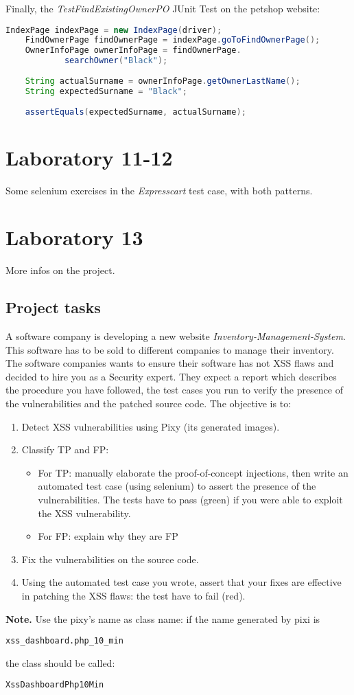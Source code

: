 \documentclass[a4paper, 10pt, titlepage]{article}
\begin{document}
Finally, the \textit{TestFindExistingOwnerPO} JUnit Test on the petshop website:
\begin{lstlisting}[language=java]
	IndexPage indexPage = new IndexPage(driver);
	FindOwnerPage findOwnerPage = indexPage.goToFindOwnerPage();
	OwnerInfoPage ownerInfoPage = findOwnerPage.
			searchOwner("Black");
		
	String actualSurname = ownerInfoPage.getOwnerLastName();
	String expectedSurname = "Black";
		
	assertEquals(expectedSurname, actualSurname);
\end{lstlisting}

\newpage
\section{Laboratory 11-12}
Some selenium exercises in the \textit{Expresscart} test case, with both patterns.

\section{Laboratory 13}
More infos on the project.
\subsection*{Project tasks}
A software company is developing a new website \textit{Inventory-Management-System}. This software has to be sold to different companies to manage their inventory. The software companies wants to ensure their software has not XSS flaws and decided to hire you as a Security expert. They expect a report which describes the procedure you have followed, the test cases you run to verify the presence of the vulnerabilities and the patched source code. The objective is to:
\begin{enumerate}
\item Detect XSS vulnerabilities using Pixy (its generated images).
\item Classify TP and FP:
\begin{itemize}
\item For TP: manually elaborate the proof-of-concept injections, then write an automated test case (using selenium) to assert the presence of the vulnerabilities. The tests have to pass (green) if you were able to exploit the XSS vulnerability.
\item For FP: explain why they are FP
\end{itemize}
\item Fix the vulnerabilities on the source code.
\item Using the automated test case you wrote, assert that your fixes are effective in patching the XSS flaws: the test have to fail (red).
\end{enumerate}
\textbf{Note.} Use the pixy's name as class name: if the name generated by pixi is
\begin{verbatim}
xss_dashboard.php_10_min
\end{verbatim}
the class should be called:
\begin{verbatim}
XssDashboardPhp10Min
\end{verbatim}
\end{document}
